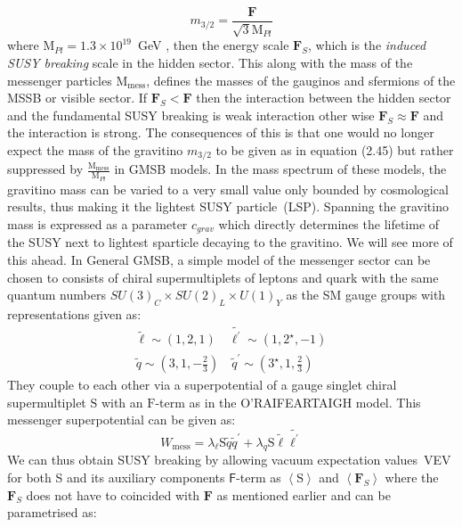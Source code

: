 {\begin{equation}
 m_{3/2} = \frac{\mathbf{F}}{{\sqrt{3}\mathrm{M}_{Pl}}}
\end{equation}
where $\displaystyle{\mathrm{M}_{Pl} = 1.3 \times 10^{19}}$~GeV , then the energy scale $\displaystyle{\mathbf{F}_{S}}$, which is the \textit{induced SUSY breaking} scale in the hidden sector. This along with the mass of the messenger particles $\mathrm{M}_{\mbox{mess}}$, defines the masses of the gauginos and sfermions of the MSSB or visible sector. If $\displaystyle{\mathbf{F}_{S} < \mathbf{F}}$ then the interaction between the hidden sector and the fundamental SUSY breaking is weak interaction other wise $\displaystyle{\mathbf{F}_{S} \approx \mathbf{F}}$ and the interaction is strong. 
The consequences of this is that one would no longer expect the mass of the gravitino $m_{3/2}$ to be given as in equation (2.45) but rather suppressed by $\frac{\mathrm{M}_{\mbox{mess}}}{\mathrm{M}_{Pl}}$ in GMSB models. In the mass spectrum of these models, the gravitino mass can be varied to a very small value only bounded by cosmological results, thus making it the lightest SUSY particle~(LSP). Spanning the gravitino mass is expressed as a parameter $c_{grav}$ which directly determines the lifetime of the SUSY next to lightest sparticle  decaying to the gravitino. We will see more of this ahead.
\newline
In General GMSB, a simple model of the messenger sector can be chosen to consists of chiral supermultiplets of leptons and quark with the same quantum numbers $SU(3)_{C}\times SU(2)_{L}\times U(1)_{Y}$ as the SM gauge groups with representations given as:
\begin{align}
\tilde{\ell} \sim (1,2,1) \quad \tilde{\ell^{\prime}} \sim (1, 2^{\star}, -1) \\
\tilde{q} \sim (3,1,-\frac{2}{3}) \quad \tilde{q}^{\prime} \sim (3^{\star}, 1, \frac{2}{3} )
\end{align}
They couple to each other via a superpotential of a gauge singlet chiral supermultiplet $\mathrm{S}$ with an $\mathrm{F}$-term as in the O'RAIFEARTAIGH model\cite{ORmodel}. This messenger superpotential can be given as:
\begin{equation}
W_{\mbox{mess}} = \lambda_{\ell}\mathrm{S}\tilde{q}\tilde{q}^{\prime} + \lambda_{q}\mathrm{S}\tilde{\ell}\tilde{\ell^{\prime}}
\end{equation}
We can thus obtain SUSY breaking by allowing vacuum expectation values~VEV for both S and its auxiliary components $\mathsf{F}$-term as $ \left\langle \mathrm{S} \right\rangle$ and $ \left\langle \mathbf{F}_{S} \right\rangle$ where the $\mathbf{F}_{S}$ does not have to coincided with $\mathbf{F}$ as mentioned earlier and can be parametrised as:
}
